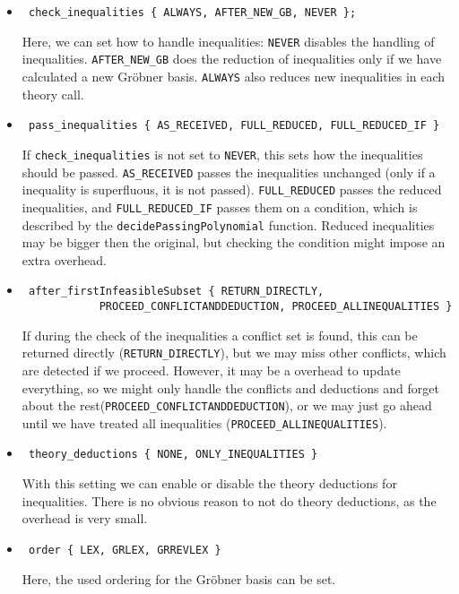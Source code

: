 \begin{itemize}
 \item \small{\begin{verbatim} check_inequalities { ALWAYS, AFTER_NEW_GB, NEVER };\end{verbatim}} 
 Here, we can set how to handle inequalities: \verb|NEVER| disables the handling of inequalities. \verb|AFTER_NEW_GB| does the reduction of inequalities only if we have calculated a new Gr\"obner basis. \verb|ALWAYS| also reduces new inequalities in each theory call. 
 \item \small{\begin{verbatim} pass_inequalities { AS_RECEIVED, FULL_REDUCED, FULL_REDUCED_IF } \end{verbatim}}
 If \verb|check_inequalities| is not set to \verb|NEVER|, this sets how the inequalities should be passed. \verb|AS_RECEIVED| passes the inequalities unchanged (only if a inequality is superfluous, it is not passed). \verb|FULL_REDUCED| passes the reduced inequalities, and \verb|FULL_REDUCED_IF| passes them on a condition,  which is described by the \verb|decidePassingPolynomial| function. Reduced inequalities may be bigger then the original, but checking the condition might impose an extra overhead. 
 \item \small{\begin{verbatim} after_firstInfeasibleSubset { RETURN_DIRECTLY,
			PROCEED_CONFLICTANDDEDUCTION, PROCEED_ALLINEQUALITIES } \end{verbatim}}
 If during the check of the inequalities a conflict set is found, this can be returned directly (\verb|RETURN_DIRECTLY|), but we may miss other conflicts, which are detected if we proceed. However, it may be a overhead to update everything, so we might only handle the conflicts and deductions and forget about the rest(\verb|PROCEED_CONFLICTANDDEDUCTION|), or we may just go ahead until we have treated all inequalities (\verb|PROCEED_ALLINEQUALITIES|). 
 \item \small{\begin{verbatim} theory_deductions { NONE, ONLY_INEQUALITIES } \end{verbatim}}           
 With this setting we can enable or disable the theory deductions for inequalities. There is no obvious reason to not do theory deductions, as the overhead is very small.
 \item \small{\begin{verbatim} order { LEX, GRLEX, GRREVLEX } \end{verbatim}}
 Here, the used ordering for the Gr\"obner basis can be set.                                                                      
\end{itemize}
